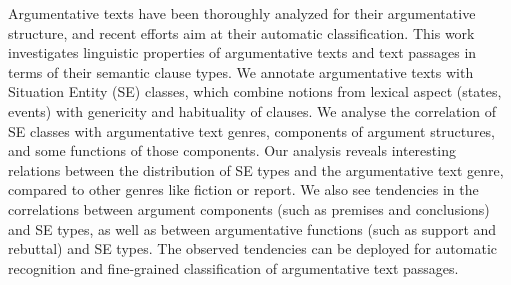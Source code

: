 Argumentative texts have been thoroughly analyzed for their argumentative structure, and recent efforts aim at their automatic classification. This work investigates linguistic properties of argumentative texts and text passages in terms of their semantic clause types. We annotate argumentative texts with Situation Entity (SE) classes, which combine notions from lexical aspect (states, events) with genericity and habituality of clauses. We analyse the correlation of SE classes with argumentative text genres, components of argument structures, and some functions of those components. Our analysis reveals interesting relations between the distribution of SE types and the  argumentative text genre, compared to other genres like fiction or report. We also see tendencies in the correlations between argument components (such as premises and conclusions) and SE types, as well as between argumentative functions (such as support and rebuttal) and SE types. The observed tendencies can be deployed for automatic recognition and fine-grained classification of argumentative text passages.
